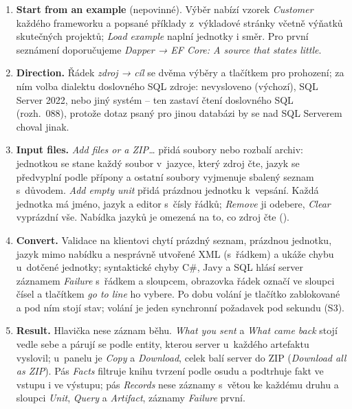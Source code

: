 \documentclass{article}
\begin{document}
\begin{enumerate}[leftmargin=*,itemsep=2pt]
\item \textbf{Start from an example} (nepovinné). Výběr nabízí vzorek \emph{Customer} každého frameworku a popsané příklady z~výkladové stránky včetně výňatků skutečných projektů; \emph{Load example} naplní jednotky i směr. Pro první seznámení doporučujeme \emph{Dapper → EF Core: A source that states little}.
\item \textbf{Direction.} Řádek \emph{zdroj → cíl} se dvěma výběry a tlačítkem pro prohození; za ním volba dialektu doslovného SQL zdroje: nevysloveno (výchozí), SQL Server 2022, nebo jiný systém -- ten zastaví čtení doslovného SQL (rozh.~088), protože dotaz psaný pro jinou databázi by se nad SQL Serverem choval jinak.
\item \textbf{Input files.} \emph{Add files or a ZIP\ldots} přidá soubory nebo rozbalí archiv: jednotkou se stane každý soubor v~jazyce, který zdroj čte, jazyk se předvyplní podle přípony a ostatní soubory vyjmenuje sbalený seznam s~důvodem. \emph{Add empty unit} přidá prázdnou jednotku k~vepsání. Každá jednotka má jméno, jazyk a editor s~čísly řádků; \emph{Remove} ji odebere, \emph{Clear} vyprázdní vše. Nabídka jazyků je omezená na to, co zdroj čte ().
\item \textbf{Convert.} Validace na klientovi chytí prázdný seznam, prázdnou jednotku, jazyk mimo nabídku a nesprávně utvořené XML (s~řádkem) a ukáže chybu u~dotčené jednotky; syntaktické chyby C\#, Javy a SQL hlásí server záznamem \emph{Failure} s~řádkem a sloupcem, obrazovka řádek označí ve sloupci čísel a tlačítkem \emph{go to line} ho vybere. Po dobu volání je tlačítko zablokované a pod ním stojí stav; volání je jeden synchronní požadavek pod sekundu (S3).
\item \textbf{Result.} Hlavička nese záznam běhu. \emph{What you sent} a \emph{What came back} stojí vedle sebe a párují se podle entity, kterou server u~každého artefaktu vyslovil; u~panelu je \emph{Copy} a \emph{Download}, celek balí server do ZIP (\emph{Download all as ZIP}). Pás \emph{Facts} filtruje knihu tvrzení podle osudu a podtrhuje fakt ve vstupu i ve výstupu; pás \emph{Records} nese záznamy s~větou ke každému druhu a sloupci \emph{Unit}, \emph{Query} a \emph{Artifact}, záznamy \emph{Failure} první.
\end{enumerate}
\end{document}
